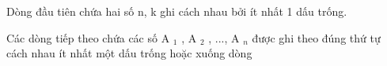 Dòng đầu tiên chứa hai số n, k ghi cách nhau bởi ít nhất 1 dấu trống.  

   Các dòng tiếp theo chứa các số A   $_    1   $   , A   $_    2   $   , ..., A   $_    n   $   được ghi theo đúng thứ tự cách nhau ít nhất một dấu trống hoặc xuống dòng  

\
